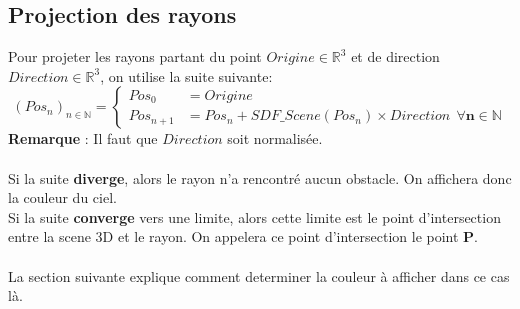\subsection{Projection des rayons}
\label{subsec:projection}
Pour projeter les rayons partant du point $Origine\in \mathbb{R}^3$ et de direction $Direction\in \mathbb{R}^3$, on utilise la suite suivante:
$$
(Pos_n)_{n\in \mathbb{N}}=\left\{
    \begin{array}{ll}
        Pos_0 &= Origine \\
        Pos_{n+1} &= Pos_n + SDF\_Scene(Pos_n)\times Direction \ \ \mathbf{\forall n\in \mathbb{N}}
    \end{array}
\right.
$$
\textbf{Remarque} : Il faut que $Direction$ soit normalisée. \\
\\
Si la suite \textbf{diverge}, alors le rayon n'a rencontré aucun obstacle. On affichera donc la couleur du ciel.\\
Si la suite \textbf{converge} vers une limite, alors cette limite est le point d'intersection entre la scene 3D et le rayon. On appelera ce point d'intersection le point \textbf{P}.\\
\\
La section suivante explique comment determiner la couleur à afficher dans ce cas là.